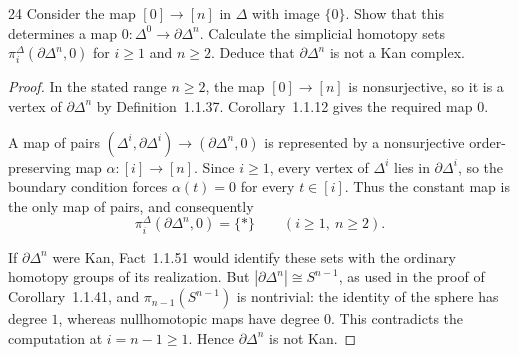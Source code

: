 \begin{exercise}{24}
Consider the map $[0]\to[n]$ in $\Delta$ with image $\{0\}$.
Show that this determines a map $0\colon\Delta^0\to\partial\Delta^n$.
Calculate the simplicial homotopy sets
$\pi_i^\Delta(\partial\Delta^n,0)$ for $i\ge1$ and $n\ge2$.
Deduce that $\partial\Delta^n$ is not a Kan complex.

\begin{proof}
In the stated range $n\ge2$, the map $[0]\to[n]$ is nonsurjective,
so it is a vertex of $\partial\Delta^n$ by Definition~1.1.37.
Corollary~1.1.12 gives the required map $0$.

A map of pairs $(\Delta^i,\partial\Delta^i)\to(\partial\Delta^n,0)$
is represented by a nonsurjective order-preserving map
$\alpha\colon[i]\to[n]$. Since $i\ge1$, every vertex of
$\Delta^i$ lies in $\partial\Delta^i$, so the boundary condition
forces $\alpha(t)=0$ for every $t\in[i]$.
Thus the constant map is the only map of pairs, and consequently
\[
 \pi_i^\Delta(\partial\Delta^n,0)=\{*\}
 \qquad(i\ge1,\ n\ge2).
\]

If $\partial\Delta^n$ were Kan, Fact~1.1.51 would identify these
sets with the ordinary homotopy groups of its realization.
But $|\partial\Delta^n|\cong S^{n-1}$, as used in the proof of
Corollary~1.1.41, and $\pi_{n-1}(S^{n-1})$ is nontrivial:
the identity of the sphere has degree $1$, whereas nullhomotopic
maps have degree $0$. This contradicts the computation at
$i=n-1\ge1$. Hence $\partial\Delta^n$ is not Kan.
\end{proof}
\end{exercise}
